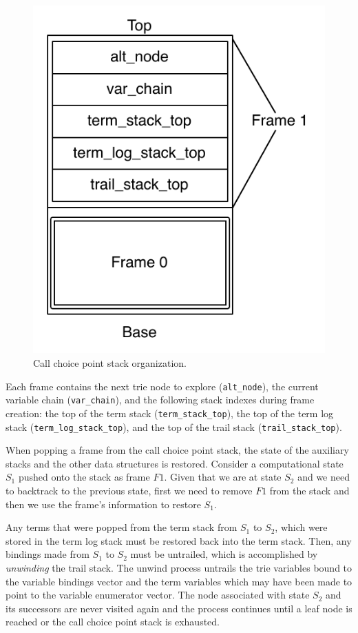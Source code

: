 \begin{figure}[ht]
  \centering
    \includegraphics[scale=0.6]{call_choice_point_stack.pdf}
  \caption{Call choice point stack organization.}
  \label{fig:call_choice_point_stack}
\end{figure}

Each frame contains the next trie node to explore (\texttt{alt\_node}),
the current variable chain (\texttt{var\_chain}),
and the following stack indexes during frame creation:
the top of the term stack (\texttt{term\_stack\_top}),
the top of the term log stack (\texttt{term\_log\_stack\_top}),
and the top of the trail stack (\texttt{trail\_stack\_top}).

When popping a frame from the call choice point stack, the state of the auxiliary stacks and the other data
structures is restored. Consider a computational state $S_1$ pushed onto the stack
as frame $F1$. Given that we are at state $S_2$ and we need to backtrack to the previous state,
first we need to remove $F1$ from the stack and then we use the frame's information to restore $S_1$.

Any terms that were popped from the term stack from $S_1$ to $S_2$, which were
stored in the term log stack must be restored back into the term stack.
Then, any bindings made from $S_1$ to $S_2$ must be untrailed, which is
accomplished by \textit{unwinding} the trail stack. The unwind process untrails
the trie variables bound to the variable bindings vector
and the term variables which may have been made to point to the variable enumerator
vector. The node associated with state $S_2$ and its successors are never visited again and
the process continues until a leaf node is reached or the call choice point stack
is exhausted.

